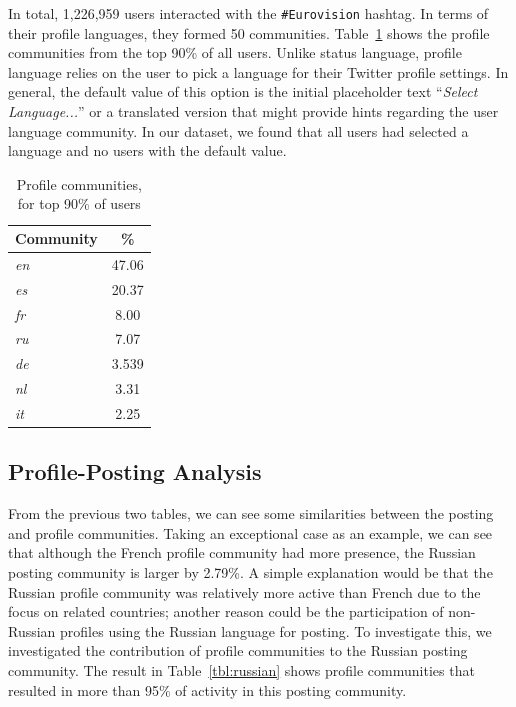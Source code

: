 In total, 1,226,959 users interacted with the {\texttt{\#Eurovision}}
hashtag. In terms of their profile languages, they formed 50
communities. Table~\ref{tbl:profcomms} shows the profile communities
from the top 90\% of all users. Unlike status language, profile
language relies on the user to pick a language for their Twitter
profile settings. In general, the default value of this option is the
initial placeholder text ``{\emph{Select Language...}}'' or a
translated version that might provide hints regarding the user
language community. In our dataset, we found that all users had
selected a language and no users with the default value.


\begin{table}[!htb]
\centering
\begin{tabular}{@{}lc}
\toprule
\textbf{Community} & \textbf{\%} \\ 
\midrule
{\emph{en}} & 47.06 \\
{\emph{es}} & 20.37 \\
{\emph{fr}} & 8.00 \\
{\emph{ru}} & 7.07 \\
{\emph{de}} & 3.539 \\
{\emph{nl}} & 3.31 \\
{\emph{it}} & 2.25 \\ 
\bottomrule
\end{tabular}
\caption{Profile communities, for top 90\% of users}
\label{tbl:profcomms}
\end{table}

\subsection{Profile-Posting Analysis}

From the previous two tables, we can see some similarities between the
posting and profile communities. Taking an exceptional case as an
example, we can see that although the French profile community had
more presence, the Russian posting community is larger by 2.79\%. A
simple explanation would be that the Russian profile community was
relatively more active than French due to the focus on related
countries; another reason could be the participation of non-Russian
profiles using the Russian language for posting. To investigate this,
we investigated the contribution of profile communities to the Russian
posting community. The result in Table~\ref{tbl:russian} shows profile
communities that resulted in more than 95\% of activity in this
posting community.


